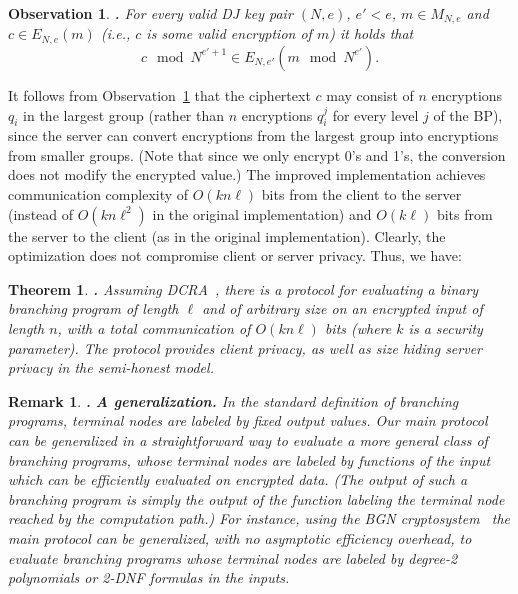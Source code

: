 \documentclass{article}
\newtheorem{THEOREM}{Theorem}[section]
\newenvironment{theorem}{\begin{THEOREM} \hspace{-.85em} {\bf .} \rm}%
	{\end{THEOREM}}
\newtheorem{REMARK}{Remark}[section]
\newenvironment{remark}{\begin{REMARK} \hspace{-.85em} {\bf .} \rm}%
	{\end{REMARK}}
\newtheorem{OBSERVATION}{Observation}[section]
\newenvironment{observation}{\begin{OBSERVATION} \hspace{-.85em} {\bf .} \rm}%
	{\end{OBSERVATION}}
\begin{document}
\begin{observation}
\label{obs-short} For every valid DJ key pair $(N,e)$, $e'<e$,
$m\in M_{N,e}$ and $c\in{E_{N,e}(m)}$ (i.e., $c$ is some valid
encryption of $m$) it holds that \[ c\mod N^{e'+1} \in
E_{N,e'}(m\mod N^{e'}).\]
\end{observation}
It follows from Observation~\ref{obs-short} that the ciphertext $c$
may consist of $n$ encryptions $q_i$ in the largest group (rather
than $n$ encryptions $q_i^j$ for every level $j$ of the BP), since
the server can convert encryptions from the largest group into
encryptions from smaller groups. (Note that since we only encrypt
0's and 1's, the conversion does not modify the encrypted value.)
The improved implementation achieves communication complexity of
$O(kn\ell)$ bits from the client to the server (instead of
$O(kn\ell^2)$ in the original implementation) and $O(k\ell)$ bits
from the server to the client (as in the original implementation).
Clearly, the optimization does not compromise client or server
privacy. Thus, we have:

\begin{theorem}
Assuming DCRA~\cite{DJ01}, there is a protocol for evaluating a
binary branching program of length $\ell$ and of arbitrary size on
an encrypted input of length $n$, with a total communication of
$O(kn\ell)$ bits (where $k$ is a security parameter). The protocol
provides client privacy, as well as size hiding server privacy in
the semi-honest model.
\end{theorem}


\begin{remark}{\bf A generalization.}
In the standard definition of branching programs, terminal nodes
are labeled by fixed output values. Our main protocol can be
generalized in a straightforward way to evaluate a more general
class of branching programs, whose terminal nodes are labeled by
functions of the input which can be efficiently evaluated on
encrypted data. (The output of such a branching program is simply
the output of the function labeling the terminal node reached by
the computation path.) For instance, using the BGN
cryptosystem~\cite{BGN} the main protocol can be generalized, with
no asymptotic efficiency overhead, to evaluate branching programs
whose terminal nodes are labeled by degree-2 polynomials or 2-DNF
formulas in the inputs.
\end{remark}
\end{document}
